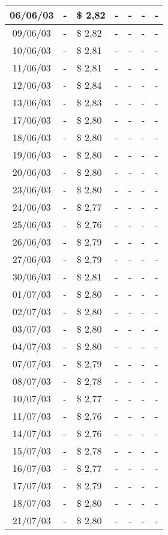 \begin{center}
\begin{longtable}{|c|p{1.5cm}|p{1.5cm}|p{1.5cm}|p{1.5cm}|p{1.5cm}|p{1.5cm}|}
06/06/03 & - & \$ 2,82 & - & - & - & - \\ \hline
09/06/03 & - & \$ 2,82 & - & - & - & - \\ \hline
10/06/03 & - & \$ 2,81 & - & - & - & - \\ \hline
11/06/03 & - & \$ 2,81 & - & - & - & - \\ \hline
12/06/03 & - & \$ 2,84 & - & - & - & - \\ \hline
13/06/03 & - & \$ 2,83 & - & - & - & - \\ \hline
17/06/03 & - & \$ 2,80 & - & - & - & - \\ \hline
18/06/03 & - & \$ 2,80 & - & - & - & - \\ \hline
19/06/03 & - & \$ 2,80 & - & - & - & - \\ \hline
20/06/03 & - & \$ 2,80 & - & - & - & - \\ \hline
23/06/03 & - & \$ 2,80 & - & - & - & - \\ \hline
24/06/03 & - & \$ 2,77 & - & - & - & - \\ \hline
25/06/03 & - & \$ 2,76 & - & - & - & - \\ \hline
26/06/03 & - & \$ 2,79 & - & - & - & - \\ \hline
27/06/03 & - & \$ 2,79 & - & - & - & - \\ \hline
30/06/03 & - & \$ 2,81 & - & - & - & - \\ \hline
01/07/03 & - & \$ 2,80 & - & - & - & - \\ \hline
02/07/03 & - & \$ 2,80 & - & - & - & - \\ \hline
03/07/03 & - & \$ 2,80 & - & - & - & - \\ \hline
04/07/03 & - & \$ 2,80 & - & - & - & - \\ \hline
07/07/03 & - & \$ 2,79 & - & - & - & - \\ \hline
08/07/03 & - & \$ 2,78 & - & - & - & - \\ \hline
10/07/03 & - & \$ 2,77 & - & - & - & - \\ \hline
11/07/03 & - & \$ 2,76 & - & - & - & - \\ \hline
14/07/03 & - & \$ 2,76 & - & - & - & - \\ \hline
15/07/03 & - & \$ 2,78 & - & - & - & - \\ \hline
16/07/03 & - & \$ 2,77 & - & - & - & - \\ \hline
17/07/03 & - & \$ 2,79 & - & - & - & - \\ \hline
18/07/03 & - & \$ 2,80 & - & - & - & - \\ \hline
21/07/03 & - & \$ 2,80 & - & - & - & - \\ \hline

\end{longtable}
\end{center}
